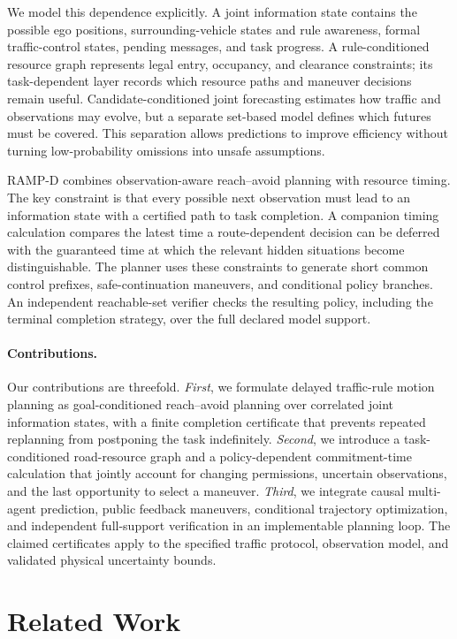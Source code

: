 \documentclass[letterpaper]{article} %
\newcommand{\RAMP}{\textsc{RAMP}}
\begin{document}
We model this dependence explicitly. A joint information state contains the possible ego positions, surrounding-vehicle states and rule awareness, formal traffic-control states, pending messages, and task progress. A rule-conditioned resource graph represents legal entry, occupancy, and clearance constraints; its task-dependent layer records which resource paths and maneuver decisions remain useful. Candidate-conditioned joint forecasting estimates how traffic and observations may evolve, but a separate set-based model defines which futures must be covered. This separation allows predictions to improve efficiency without turning low-probability omissions into unsafe assumptions.

\RAMP-D combines observation-aware reach--avoid planning with resource timing. The key constraint is that every possible next observation must lead to an information state with a certified path to task completion. A companion timing calculation compares the latest time a route-dependent decision can be deferred with the guaranteed time at which the relevant hidden situations become distinguishable. The planner uses these constraints to generate short common control prefixes, safe-continuation maneuvers, and conditional policy branches. An independent reachable-set verifier checks the resulting policy, including the terminal completion strategy, over the full declared model support.

\paragraph{Contributions.}
Our contributions are threefold. \emph{First}, we formulate delayed traffic-rule motion planning as goal-conditioned reach--avoid planning over correlated joint information states, with a finite completion certificate that prevents repeated replanning from postponing the task indefinitely. \emph{Second}, we introduce a task-conditioned road-resource graph and a policy-dependent commitment-time calculation that jointly account for changing permissions, uncertain observations, and the last opportunity to select a maneuver. \emph{Third}, we integrate causal multi-agent prediction, public feedback maneuvers, conditional trajectory optimization, and independent full-support verification in an implementable planning loop. The claimed certificates apply to the specified traffic protocol, observation model, and validated physical uncertainty bounds.

\section{Related Work}
\end{document}
